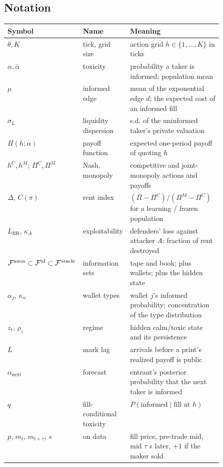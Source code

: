 \subsection*{Notation}
\begin{center}\small
\begin{tabular}{llp{0.5\linewidth}}
\toprule
Symbol & Name & Meaning \\
\midrule
$\theta,K$ & tick, grid size & action grid $h\in\{1,\dots,K\}$ in ticks \\
$\alpha,\bar\alpha$ & toxicity & probability a taker is informed; population mean \\
$\mu$ & informed edge & mean of the exponential edge $d$; the expected cost of an informed fill \\
$\sigma_L$ & liquidity dispersion & s.d. of the uninformed taker's private valuation \\
$\Pi(h;\alpha)$ & payoff function & expected one-period payoff of quoting $h$ \\
$h^C,h^M$; $\Pi^C,\Pi^M$ & Nash, monopoly & competitive and joint-monopoly actions and payoffs \\
$\Delta$, $C(\pi)$ & rent index & $(\bar\Pi-\Pi^C)/(\Pi^M-\Pi^C)$ for a learning / frozen population \\
$L_{\mathrm{BR}}$, $\kappa_A$ & exploitability & defenders' loss against attacker $A$; fraction of rent destroyed \\
$\mathcal{F}^{\mathrm{anon}}\subset\mathcal{F}^{\mathrm{id}}\subset\mathcal{F}^{\mathrm{oracle}}$ & information sets & tape and book; plus wallets; plus the hidden state \\
$\alpha_j$, $\kappa_\alpha$ & wallet types & wallet $j$'s informed probability; concentration of the type distribution \\
$z_t$, $\rho_z$ & regime & hidden calm/toxic state and its persistence \\
$L$ & mark lag & arrivals before a print's realized payoff is public \\
$\alpha_{\mathrm{next}}$ & forecast & entrant's posterior probability that the next taker is informed \\
$q$ & fill-conditional toxicity & $P(\text{informed}\mid\text{fill at }h)$ \\
$p$, $m_t$, $m_{t+\tau}$, $s$ & on data & fill price, pre-trade mid, mid $\tau$ s later, $+1$ if the maker sold \\
\bottomrule
\end{tabular}
\end{center}
